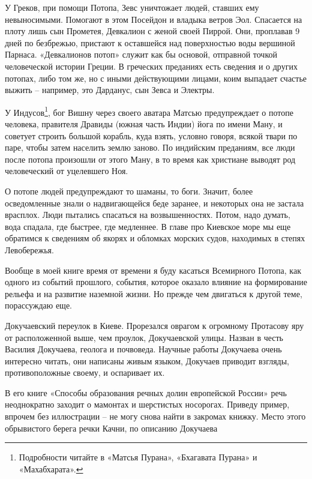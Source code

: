 У Греков, при помощи Потопа, Зевс уничтожает людей, ставших ему невыносимыми. Помогают в этом Посейдон и владыка ветров Эол. Спасается на плоту лишь сын Прометея, Девкалион с женой своей Пиррой. Они, проплавав 9 дней по безбрежью, пристают к оставшейся над поверхностью воды вершиной Парнаса. «Девкалионов потоп» служит как бы основой, отправной точкой человеческой истории Греции. В греческих преданиях есть сведения и о других потопах, либо том же, но с иными действующими лицами, коим выпадает счастье выжить – например, это Дарданус, сын Зевса и Электры.

У Индусов\footnote{Подробности читайте в «Матсья Пурана», «Бхагавата Пурана» и «Махабхарата».}, бог Вишну через своего аватара Матсью предупреждает о потопе человека, правителя Дравиды (южная часть Индии) йога по имени Ману, и советует строить большой корабль, куда взять, условно говоря, всякой твари по паре, чтобы затем населить землю заново. По индийским преданиям, все люди после потопа произошли от этого Ману, в то время как христиане выводят род человеческий от уцелевшего Ноя.

О потопе людей предупреждают то шаманы, то боги. Значит, более осведомленные знали о надвигающейся беде заранее, и некоторых она не застала врасплох. Люди пытались спасаться на возвышенностях. Потом, надо думать, вода спадала, где быстрее, где медленнее. В главе про Киевское море мы еще обратимся к сведениям об якорях и обломках морских судов, находимых в степях Левобережья.

Вообще в моей книге время от времени я буду касаться Всемирного Потопа, как одного из событий прошлого, события, которое оказало влияние на формирование рельефа и на развитие наземной жизни. Но прежде чем двигаться к другой теме, порассуждаю еще.

Докучаевский переулок в Киеве. Прорезался оврагом к огромному Протасову яру от расположенной выше, чем проулок, Докучаевской улицы. Назван в честь Василия Докучаева, геолога и почвоведа. Научные работы Докучаева очень интересно читать, они написаны живым языком, Докучаев приводит взгляды, противоположные своему, и оспаривает их.

В его книге «Способы образования речных долин европейской России» речь неоднократно  заходит о мамонтах и шерстистых носорогах. Приведу пример, впрочем без иллюстрации – не могу снова найти в закромах книжку. Место этого обрывистого берега речки Качни, по описанию Докучаева

